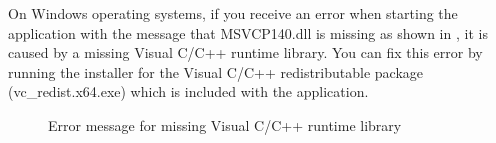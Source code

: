 On Windows operating systems, if you receive an error when starting the application with the message that MSVCP140.dll is missing as shown in , it is caused by a missing Visual C/C++ runtime library. You can fix this error by running the installer for the Visual C/C++ redistributable package (vc\_redist.x64.exe) which is included with the application.

\begin{figure}[!htbp]
  \caption{Error message for missing Visual C/C++ runtime library}
  \label{fig:Missing_CRT_Error}
\end{figure}

